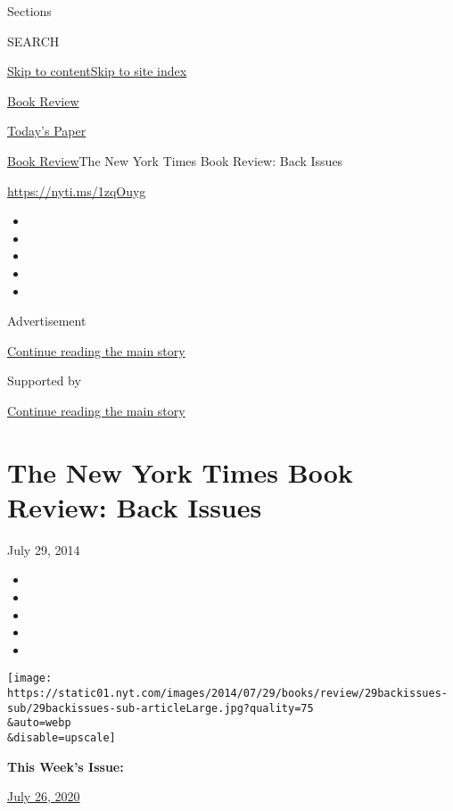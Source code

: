 Sections

SEARCH

\protect\hyperlink{site-content}{Skip to
content}\protect\hyperlink{site-index}{Skip to site index}

\href{https://www.nytimes.com/section/books/review}{Book Review}

\href{https://myaccount.nytimes.com/auth/login?response_type=cookie\&client_id=vi}{}

\href{https://www.nytimes.com/section/todayspaper}{Today's Paper}

\href{/section/books/review}{Book Review}\textbar{}The New York Times
Book Review: Back Issues

\url{https://nyti.ms/1zqOuyg}

\begin{itemize}
\item
\item
\item
\item
\item
\end{itemize}

Advertisement

\protect\hyperlink{after-top}{Continue reading the main story}

Supported by

\protect\hyperlink{after-sponsor}{Continue reading the main story}

\hypertarget{the-new-york-times-book-review-back-issues}{%
\section{The New York Times Book Review: Back
Issues}\label{the-new-york-times-book-review-back-issues}}

July 29, 2014

\begin{itemize}
\item
\item
\item
\item
\item
\end{itemize}

\texttt{[image: https://static01.nyt.com/images/2014/07/29/books/review/29backissues-sub/29backissues-sub-articleLarge.jpg?quality=75\\\&auto=webp\\\&disable=upscale]}

\textbf{This Week's Issue:}

\href{https://www.nytimes.com/issue/todayspaper/2020/07/26/todays-new-york-times\#bookreview}{July
26, 2020}

